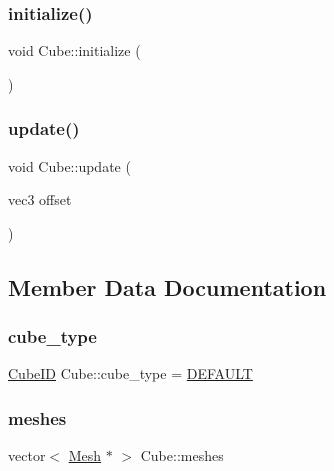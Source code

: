 \mbox{\label{classCube_a612b349fc162d1c59dc8c45bcc33f93b}} 
\subsubsection{\texorpdfstring{initialize()}{initialize()}}
{\footnotesize\ttfamily void Cube\+::initialize (\begin{DoxyParamCaption}{ }\end{DoxyParamCaption})\hspace{0.3cm}{\ttfamily [static]}}

\mbox{\label{classCube_a038c53e0df559a029e9558a7f4b16e56}} 
\subsubsection{\texorpdfstring{update()}{update()}}
{\footnotesize\ttfamily void Cube\+::update (\begin{DoxyParamCaption}\item[{vec3}]{offset }\end{DoxyParamCaption})}



\subsection{Member Data Documentation}
\mbox{\label{classCube_a4c15451eb6d1f99fd08f1f840aa8cec7}} 
\subsubsection{\texorpdfstring{cube\+\_\+type}{cube\_type}}
{\footnotesize\ttfamily \mbox{\hyperlink{Cube_8hpp_ae2a13060ddab6f6437cc4d66a1f7c370}{Cube\+ID}} Cube\+::cube\+\_\+type = \mbox{\hyperlink{Cube_8hpp_ae2a13060ddab6f6437cc4d66a1f7c370a88ec7d5086d2469ba843c7fcceade8a6}{D\+E\+F\+A\+U\+LT}}}

\mbox{\label{classCube_a4470b28c7fff28dd9058ea96307c1000}} 
\subsubsection{\texorpdfstring{meshes}{meshes}}
{\footnotesize\ttfamily vector$<$ \mbox{\hyperlink{structMesh}{Mesh}} $\ast$ $>$ Cube\+::meshes\hspace{0.3cm}{\ttfamily [static]}}

